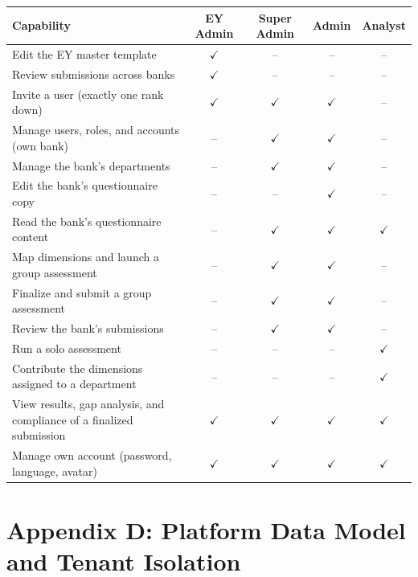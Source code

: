 \vspace{0.6em}
{\small
\setlength{\tabcolsep}{4pt}
\begin{center}
\begin{tabular}{|p{7.2cm}|c|c|c|c|}
\hline
\textbf{Capability} & \textbf{EY Admin} & \textbf{Super Admin} & \textbf{Admin} & \textbf{Analyst} \\
\hline
Edit the EY master template & $\checkmark$ & -- & -- & -- \\
\hline
Review submissions across banks & $\checkmark$ & -- & -- & -- \\
\hline
Invite a user (exactly one rank down) & $\checkmark$ & $\checkmark$ & $\checkmark$ & -- \\
\hline
Manage users, roles, and accounts (own bank) & -- & $\checkmark$ & $\checkmark$ & -- \\
\hline
Manage the bank's departments & -- & $\checkmark$ & $\checkmark$ & -- \\
\hline
Edit the bank's questionnaire copy & -- & -- & $\checkmark$ & -- \\
\hline
Read the bank's questionnaire content & -- & $\checkmark$ & $\checkmark$ & $\checkmark$ \\
\hline
Map dimensions and launch a group assessment & -- & $\checkmark$ & $\checkmark$ & -- \\
\hline
Finalize and submit a group assessment & -- & $\checkmark$ & $\checkmark$ & -- \\
\hline
Review the bank's submissions & -- & $\checkmark$ & $\checkmark$ & -- \\
\hline
Run a solo assessment & -- & -- & -- & $\checkmark$ \\
\hline
Contribute the dimensions assigned to a department & -- & -- & -- & $\checkmark$ \\
\hline
View results, gap analysis, and compliance of a finalized submission & $\checkmark$ & $\checkmark$ & $\checkmark$ & $\checkmark$ \\
\hline
Manage own account (password, language, avatar) & $\checkmark$ & $\checkmark$ & $\checkmark$ & $\checkmark$ \\
\hline
\end{tabular}
\end{center}
}
\label{tab:role-matrix}

\clearpage
{}
\section*{Appendix D: Platform Data Model and Tenant Isolation}

